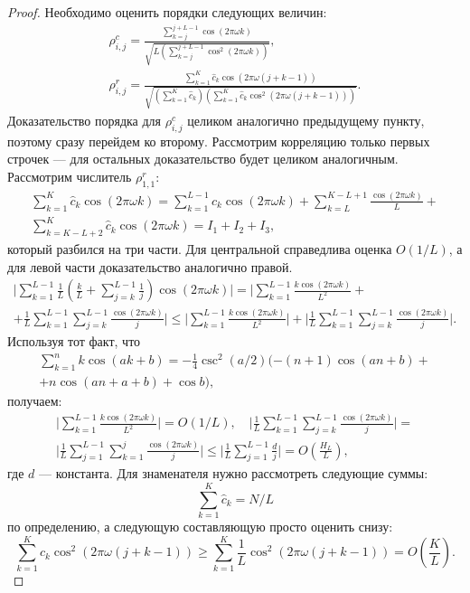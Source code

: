 \documentclass[12pt,a4paper,fleqn,leqno]{article}
\begin{document}
\begin{proof}
Необходимо оценить порядки следующих величин:
\begin{gather*}
\rho^c_{i,j} = \frac{\sum_{k=j}^{j + L - 1} \cos(2 \pi \omega k)}{\sqrt{L (\sum_{k=j}^{j + L - 1} \cos^2(2 \pi \omega k))}}, \\ \rho^r_{i,j} = \frac{\sum_{k=1}^K \hat c_k\cos(2 \pi \omega (j + k - 1))}{\sqrt{(\sum_{k=1}^K \hat c_k) (\sum_{k=1}^K \hat c_k\cos^2(2 \pi \omega (j + k - 1)))}}.
\end{gather*}
Доказательство порядка для $\rho^c_{i,j}$ целиком аналогично предыдущему пункту, поэтому сразу перейдем ко второму. Рассмотрим корреляцию только первых строчек --- для остальных доказательство будет целиком аналогичным. Рассмотрим числитель $\rho^r_{1,1}$:
\begin{gather*}
\sum_{k=1}^K \hat c_k\cos(2 \pi \omega k) = \sum_{k=1}^{L-1} \hat c_k\cos(2 \pi \omega k) + \sum_{k=L}^{K - L + 1} \frac{\cos(2 \pi \omega k)}{L} +\\ \sum_{k=K - L + 2}^{K} \hat c_k\cos(2 \pi \omega k) = I_1 + I_2 + I_3,
\end{gather*}
который разбился на три части. Для центральной справедлива оценка $O(1/L)$, а для левой части доказательство аналогично правой.
\begin{gather*}
\bigg|\sum_{k=1}^{L-1}\frac{1}{L}\left(\frac{k}{L} + \sum_{j=k}^{L-1} \frac{1}{j} \right) \cos(2 \pi \omega k)\bigg| = \bigg|\sum_{k=1}^{L-1} \frac{k \cos(2 \pi \omega k)}{L^2} + \\ + \frac{1}{L}\sum_{k = 1}^{L-1}\sum_{j = k}^{L-1}\frac{\cos(2 \pi \omega k)}{j}\bigg| \le
\bigg|\sum_{k=1}^{L-1} \frac{k \cos(2 \pi \omega k)}{L^2}\bigg| + \bigg|\frac{1}{L}\sum_{k = 1}^{L-1}\sum_{j = k}^{L-1}\frac{\cos(2 \pi \omega k)}{j}\bigg|.
\end{gather*}
Используя тот факт, что
\begin{gather*}
\sum_{k=1}^n k \cos(ak + b) = -\frac{1}{4}\csc^2(a/2)(-(n+1)\cos(an+b) + \\ + n\cos(an + a + b) + \cos b),
\end{gather*}
получаем:
\begin{gather*}
\bigg|\sum_{k=1}^{L-1} \frac{k \cos(2 \pi \omega k)}{L^2}\bigg| = O(1/L), \quad
\bigg|\frac{1}{L}\sum_{k = 1}^{L-1}\sum_{j = k}^{L-1}\frac{\cos(2 \pi \omega k)}{j}\bigg| = \\ \bigg|\frac{1}{L}\sum_{j = 1}^{L-1}\sum_{k = 1}^{j}\frac{\cos(2 \pi \omega k)}{j}\bigg| \le \bigg|\frac{1}{L}\sum_{j = 1}^{L-1}\frac{d}{j}\bigg| = O \left(\frac{H_L}{L} \right),
\end{gather*}
где $d$ --- константа. Для знаменателя нужно рассмотреть следующие суммы:
\begin{equation*}
\sum_{k=1}^K \hat c_k = N / L
\end{equation*}
по определению, а следующую составляющую просто оценить снизу:
\begin{equation*}
\sum_{k=1}^K \hat c_k\cos^2(2 \pi \omega (j + k - 1)) \ge \sum_{k=1}^K \frac{1}{L}\cos^2(2 \pi \omega (j + k - 1)) = O \left(\frac{K}{L} \right).
\end{equation*}
\end{proof}
\end{document}
